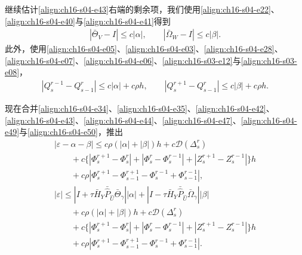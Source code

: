 ﻿\documentclass[../../main.tex]{subfiles}
\begin{document}
继续估计\eqref{align:ch16-s04-e43}右端的剩余项，我们使用\eqref{align:ch16-s04-e22}、\eqref{align:ch16-s04-e40}与\eqref{align:ch16-s04-e41}得到
\begin{align}
|\bar\Theta_V-I|\leqslant c|\alpha|,\qquad|\bar\Omega_W-I|\leqslant c|\beta|.
\label{align:ch16-s04-e49}
\end{align}
此外，使用\eqref{align:ch16-s04-e05}、\eqref{align:ch16-s04-e03}、\eqref{align:ch16-s04-e28}、\eqref{align:ch16-s04-e07}、\eqref{align:ch16-s04-e06}、\eqref{align:ch16-s03-e12}与\eqref{align:ch16-s03-e08}，
\begin{align}
|Q_s^{r-1}-Q_{s-1}^r|\leqslant c|\alpha|+c\rho h,\qquad|Q_s^{r+1}-Q_{s-1}^r|\leqslant c|\beta|+c\rho h.
\label{align:ch16-s04-e50}
\end{align}

现在合并\eqref{align:ch16-s04-e34}、\eqref{align:ch16-s04-e35}、\eqref{align:ch16-s04-e42}、\eqref{align:ch16-s04-e43}、\eqref{align:ch16-s04-e44}、\eqref{align:ch16-s04-e47}、\eqref{align:ch16-s04-e49}与\eqref{align:ch16-s04-e50}，推出
\begin{align}
|\varepsilon-\alpha-\beta|\leqslant c\rho(|\alpha|+|\beta|)h+c\mathscr{D}(\Delta_s^r)\nonumber\\
\qquad+c\{|\Phi_s^{r+1}-\Phi_s^r|+|\Phi_s^r-\Phi_s^{r-1}|+|Z_s^{r+1}-Z_s^{r-1}|\}h\nonumber\\
\qquad+c\rho|\Phi_s^{r+1}-\Phi_{s-1}^{r+1}-\Phi_s^{r-1}+\Phi_{s-1}^{r-1}|,
\label{align:ch16-s04-e51}\\
|\varepsilon|\leqslant|I+\tau\bar H_Y\bar{\hat P}_{\hat U}\bar\Theta_\gamma||\alpha|+|I-\tau\bar H_Y\bar{\hat P}_{\hat U}\bar\Omega_\gamma||\beta|\nonumber\\
\qquad+c\rho(|\alpha|+|\beta|)h+c\mathscr{D}(\Delta_s^r)\nonumber\\
\qquad+c\{|\Phi_s^{r+1}-\Phi_s^r|+|\Phi_s^r-\Phi_s^{r-1}|+|Z_s^{r+1}-Z_s^{r-1}|\}h\nonumber\\
\qquad+c\rho|\Phi_s^{r+1}-\Phi_{s-1}^{r+1}-\Phi_s^{r-1}+\Phi_{s-1}^{r-1}|.
\label{align:ch16-s04-e52}
\end{align}
\end{document}
